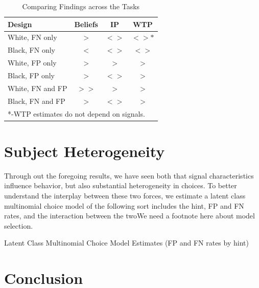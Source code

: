 \documentclass[12pt,a4paper]{article}
\newcommand{\pmt}[1]{{\color{Blue}#1}}
\begin{document}
\begin{table}[H]\centering
\caption{Comparing Findings across the Tasks}
\begin{tabular}{l|c|c|c}
\hline \hline
Design & Beliefs & IP &WTP\\
\hline
White, FN only & $>$ & $<>$ & $<>*$ \\
Black, FN only & $<$ & $<>$ & $<>$ \\
White, FP only & $>$ & $>$ & $>$ \\
Black, FP only & $>$ & $<>$ & $>$ \\
White, FN and FP & $>>$ & $>$ & $>$ \\
Black, FN and FP & $>$ & $<>$ & $>$\\
\hline
\multicolumn{4}{l}{*-WTP estimates do not depend on signals.}\\
\end{tabular}
\end{table}



\newpage
\singlespacing
\small

\section{Subject Heterogeneity}

Through out the foregoing results, we have seen both that signal characteristics influence behavior, but also substantial heterogeneity in choices.  To better understand the interplay between these two forces, we estimate a latent class multinomial choice model of the following sort \pmt{includes the hint, FP and FN rates, and the interaction between the two}\pmt{We need a footnote here about model selection}.


\begin{table}[H]
\caption{Latent Class Multinomial Choice Model Estimates (FP and FN rates by hint)}

\end{table}

%










\section{Conclusion}
\end{document}
